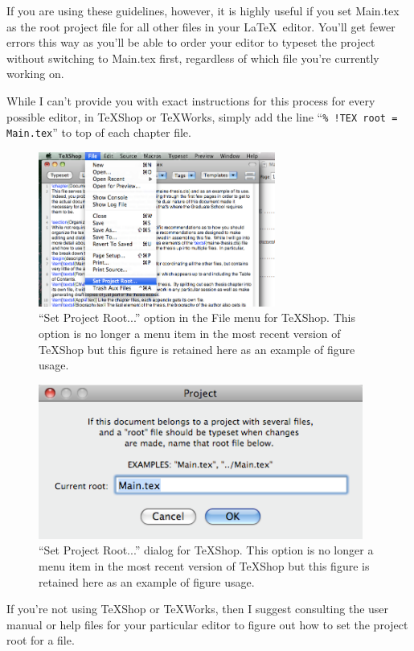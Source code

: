 If you are using these guidelines, however, it is highly useful if you set Main.tex as the root project file for all other files in your \LaTeX\ editor.  You'll get fewer errors this way as you'll be able to order your editor to typeset the project without switching to Main.tex first, regardless of which file you're currently working on.

While I can't provide you with exact instructions for this process for every possible editor, in TeXShop or TeXWorks, simply add the line ``\verb|% !TEX root =  Main.tex|'' to top of each chapter file.

\begin{figure}
\includegraphics[height=2in]{Figures/ProjectRoot}
\caption[``Set Project Root...'' option in the File menu for TeXShop.]{``Set Project Root...'' option in the File menu for TeXShop.  This option is no longer a menu item in the most recent version of TeXShop but this figure is retained here as an example of figure usage.}
\label{rootmenu}
\end{figure}

\begin{figure}
\includegraphics[height=2in]{Figures/Dialog}
\caption[``Set Project Root...'' dialog for TeXShop. ]{``Set Project Root...'' dialog for TeXShop.  This option is no longer a menu item in the most recent version of TeXShop but this figure is retained here as an example of figure usage.}
\label{rootdialog}
\end{figure}

If you're not using TeXShop or TeXWorks, then I suggest consulting the user manual or help files for your particular editor to figure out how to set the project root for a file.

